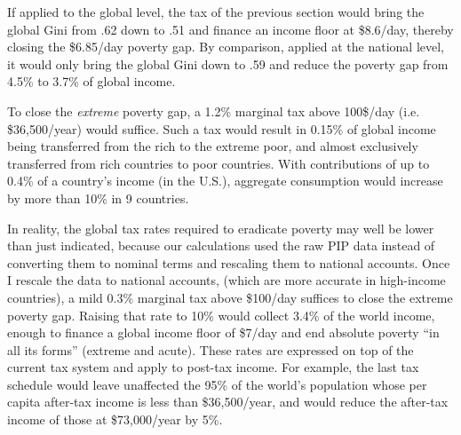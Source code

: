 If applied to the global level, the tax of the previous section would bring the global Gini from .62 down to .51 and finance an income floor at \$8.6/day, thereby closing the \$6.85/day poverty gap. By comparison, applied at the national level, it would only bring the global Gini down to .59 and reduce the poverty gap from 4.5\% to 3.7\% of global income. 

To close the \textit{extreme} poverty gap, a 1.2\% marginal tax %
above 100\$/day (i.e. \$36,500/year) would suffice. %
Such a tax would result in 0.15\% of global income being transferred from the rich to the extreme poor, and almost exclusively transferred from rich countries to poor countries. 
With contributions of up to 0.4\% of a country's income (in the U.S.), aggregate consumption would increase by more than 10\% in 9 countries. 

In reality, the global tax rates required to eradicate poverty may well be lower than just indicated, because our calculations used the raw PIP data instead of converting them to nominal terms and rescaling them to national accounts. Once I rescale the data to national accounts, (which are more accurate in high-income countries), 
a mild 0.3\% marginal tax above \$100/day suffices to close the extreme poverty gap. Raising that rate to 10\% would collect 3.4\% of the world income, enough to finance a global income floor of \$7/day and end absolute poverty ``in all its forms'' (extreme and acute). %
These rates are expressed on top of the current tax system and apply to post-tax income. For example, the last tax schedule would leave unaffected the 95\% of the world's population whose per capita after-tax income is less than \$36,500/year, and would reduce the after-tax income of those at \$73,000/year by 5\%. 

